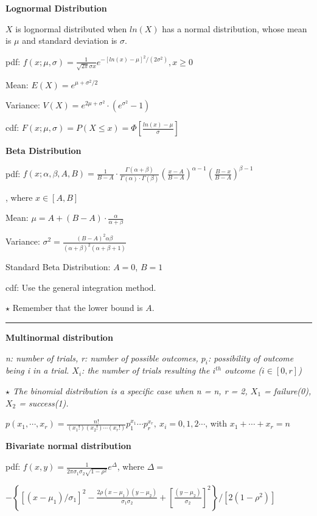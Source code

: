 \documentclass{article}
\newcommand{\sectionline}{\color{black}\rule[2pt]{0.45\textwidth}{0.05em}\color{black}}
\newcommand{\bigtitle}[1]{
	\noindent
	\textbf{#1}
}
\begin{document}
	\bigtitle{Lognormal Distribution}
	
	$X$ is lognormal distributed when $ln(X)$ has a normal distribution, whose mean is $\mu$ and standard deviation is $\sigma$.
	
	pdf: $
	f(x;\mu,\sigma) = \frac{1}{\sqrt{2\pi}\sigma x}e^{-\left[ln(x)-\mu\right]^2/(2\sigma^2)}
	, x\geq 0
	$
	
	Mean: $ E(X) = e^{\mu + \sigma^2/2}$
	
	Variance: $V(X) = e^{2\mu + \sigma^2}\cdot (e^{\sigma^2}-1)$
	
	cdf: $F(x;\mu,\sigma) = P(X\leq x) = \Phi\left[\frac{ln(x)-\mu}{\sigma}\right]$
	
	
	\bigtitle{Beta Distribution}
	
	
	pdf:
	$
	f(x;\alpha,\beta,A,B) = 
	\frac{1}{B-A}
	\cdot \frac{\Gamma(\alpha + \beta)}{\Gamma(\alpha) \cdot \Gamma(\beta)}
	\left( \frac{x-A}{B-A}\right)^{\alpha-1}
	\left( \frac{B-x}{B-A}\right)^{\beta -1}
	$
	
	, where $x \in [A,B]$
	
	Mean: $\mu = A+(B-A)\cdot \frac{\alpha}{\alpha + \beta}$
	
	Variance: $ \sigma^2 = \frac
	{(B-A)^2\alpha\beta}
	{(\alpha+\beta)^2(\alpha+\beta+1)}$
	
	Standard Beta Distribution: $A = 0$, $B = 1$
	
	cdf: Use the general integration method. 
	
	$\star$ Remember that the lower bound is $A$.
	
	\sectionline
	
	\bigtitle{Multinormal distribution}
	
	\textit{n: number of trials, r: number of possible outcomes, $p_i$: possibility of outcome being i in a trial. $X_i$: the number of trials resulting the $i^{th}$ outcome ($i\in [0,r]$)}
	
	\textit{$\star$ The binomial distribution is  a specific case when n = n, r = 2, $X_1$ = failure(0), $X_2$ = success(1).}
	
	$p(x_1,\cdots,x_r) = \frac{n!}{(x_1!)(x_2!)\cdots(x_r!)}p_1^{x_1}\cdots p_r^{x_r},\:x_i = 0,1,2\cdots$,
	with $x_1+\cdots+x_r = n$
	
	
	\bigtitle{Bivariate normal distribution}
	
	pdf: 
	$f(x,y) = \frac{1}{2\pi\sigma_1\sigma_2\sqrt{1-\rho^2}}e^{\Delta}$, where $\Delta = $
	
	$-\left\lbrace[(x-\mu_1)/\sigma_1]^2-\frac{2\rho(x-\mu_1)(y-\mu_2)}{\sigma_1\sigma_2}+[\frac{(y-\mu_2)}{\sigma_2}]^2\right\rbrace/[2(1-\rho^2)]$
	
\end{document}
